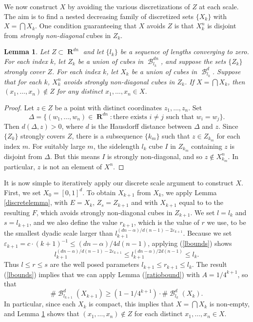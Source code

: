 \documentclass[dvipsnames,letterpaper,12pt]{article}
\theoremstyle{plain}
\newtheorem{lemma}{Lemma}
\DeclareMathOperator{\RR}{\mathbf{R}}
\DeclareMathOperator{\B}{\mathcal{B}}
\begin{document}
We now construct $X$ by avoiding the various discretizations of $Z$ at each scale. The aim is to find a nested decreasing family of discretized sets $\{ X_k \}$ with $X = \bigcap X_k$. One condition guaranteeing that $X$ avoids $Z$ is that $X_k^n$ is disjoint from {\it strongly non-diagonal} cubes in $Z_k$.

\begin{lemma} \label{stronglydiagonal}
	Let $Z \subset \RR^{dn}$ and let $\{ l_k \}$ be a sequence of lengths converging to zero. For each index $k$, let $Z_k$ be a union of cubes in $\B^{dn}_{l_k}$, and suppose the sets $\{ Z_k \}$ strongly cover $Z$. For each index $k$, let $X_k$ be a union of cubes in $\B^d_{l_k}$. Suppose that for each $k$, $X_k^n$ avoids strongly non-diagonal cubes in $Z_k$. If $X = \bigcap X_k$, then $(x_1, \dots, x_n) \not \in Z$ for any distinct $x_1, \dots, x_n \in X$.
\end{lemma}
\begin{proof}
	Let $z \in Z$ be a point with distinct coordinates $z_1, \dots, z_n$. Set
	\[ \Delta = \{ (w_1, \dots, w_n) \in \RR^{dn}: \text{there exists $i \neq j$ such that $w_i = w_j$} \}. \]
	Then $d(\Delta,z) > 0$, where $d$ is the Hausdorff distance between $\Delta$ and $z$. Since $\{ Z_k \}$ strongly covers $Z$, there is a subsequence $\{ k_m \}$ such that $z \in Z_{k_m}$ for each index $m$. For suitably large $m$, the sidelength $l_k$ cube $I$ in $Z_{k_m}$ containing $z$ is disjoint from $\Delta$. But this means $I$ is strongly non-diagonal, and so $z \not \in X_{k_m}^n$. In particular, $z$ is not an element of $X^n$.
\end{proof}

It is now simple to iteratively apply our discrete scale argument to construct $X$. First, we set $X_0 = [0,1]^d$. To obtain $X_{k+1}$ from $X_k$, we apply Lemma \ref{discretelemma}, with $E = X_k$, $Z_s = Z_{k+1}$ and with $X_{k+1}$ equal to to the resulting $F$, which avoids strongly non-diagonal cubes in $Z_{k+1}$. We set $l = l_k$ and $s = l_{k+1}$, and we also define the value $r_{k+1}$, which is the value of $r$ we use, to be the smallest dyadic scale larger than $l_{k+1}^{(dn - \alpha)/d(n-1) - 2 \varepsilon_{k+1}}$. Because we set $\varepsilon_{k+1} = c \cdot (k+1)^{-1} \leq (dn - \alpha)/4d(n-1)$, applying (\ref{lbounds}) shows
%
\[ l_{k+1}^{(dn - \alpha)/d(n-1) - 2 \varepsilon_{k+1}} \leq l_{k+1}^{(dn - \alpha)/2d(n-1)} \leq l_k. \]
%
Thus $l \leq r \leq s$ are the well posed parameters $l_{k+1} \leq r_{k+1} \leq l_k$. The result (\ref{lbounds}) implies that we can apply Lemma (\ref{ratiobound}) with $A = 1/4^{k + 1}$, so that
%
\[ \# \B^d_{l_{k+1}} (X_{k+1}) \geq (1 - 1/4^{k + 1}) \cdot \# \B^d_{l_k}(X_k). \]
%
In particular, since each $X_k$ is compact, this implies that $X = \bigcap X_k$ is non-empty, and Lemma \ref{stronglydiagonal} shows that $(x_1, \dots, x_n) \not \in Z$ for each distinct $x_1, \dots, x_n \in X$.
\end{document}
